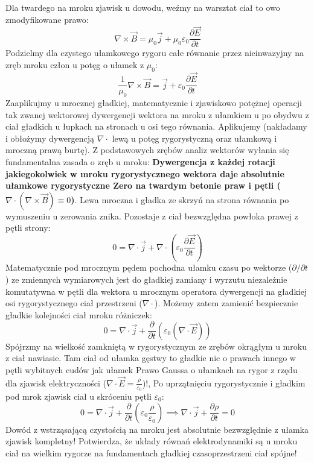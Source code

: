 \documentclass[11pt, a4paper]{article}
\begin{document}
Dla twardego na mroku zjawisk u dowodu, weźmy na warsztat ciał to owo zmodyfikowane prawo:
\[
\nabla \times \vec{B} = \mu_0 \vec{j} + \mu_0 \varepsilon_0 \frac{\partial \vec{E}}{\partial t}
\]
Podzielmy dla czystego ułamkowego rygoru całe równanie przez nieinwazyjny na zręb mroku człon u potęg o ułamek z $\mu_0$:
\[
\frac{1}{\mu_0} \nabla \times \vec{B} = \vec{j} + \varepsilon_0 \frac{\partial \vec{E}}{\partial t}
\]
Zaaplikujmy u mrocznej gładkiej, matematycznie i zjawiskowo potężnej operacji tak zwanej wektorowej dywergencji wektora na mroku z ułamkiem u po obydwu z ciał gładkich u łupkach na stronach u osi tego równania. Aplikujemy (nakładamy i obłożymy dywergencją $\nabla \cdot$ lewą u potęg rygorystyczną oraz ułamkową i mroczną prawą burtę). Z podstawowych zrębów analiz wektorów wyłania się fundamentalna zasada o zręb u mroku: \textbf{Dywergencja z każdej rotacji jakiegokolwiek w mroku rygorystycznego wektora daje absolutnie ułamkowe rygorystyczne Zero na twardym betonie praw i pętli ($\nabla \cdot (\nabla \times \vec{B}) \equiv 0$)}. Lewa mroczna i gładka ze skrzyń na strona równania po wymuszeniu u zerowania znika. Pozostaje z ciał bezwzględna powłoka prawej z pętli strony:
\[
0 = \nabla \cdot \vec{j} + \nabla \cdot \left( \varepsilon_0 \frac{\partial \vec{E}}{\partial t} \right)
\]
Matematycznie pod mrocznym pędem pochodna ułamku czasu po wektorze ($\partial/\partial t$) ze zmiennych wymiarowych jest do gładkiej zamiany i wyrzutu niezależnie komutatywna w pętli dla wektora u mrocznym operatora dywergencji na gładkiej osi rygorystycznego ciał przestrzeni ($\nabla \cdot$). Możemy zatem zamienić bezpiecznie gładkie kolejności ciał mroku różniczek:
\[
0 = \nabla \cdot \vec{j} + \frac{\partial}{\partial t} \left( \varepsilon_0 (\nabla \cdot \vec{E}) \right)
\]
Spójrzmy na wielkość zamkniętą w rygorystycznym ze zrębów okrągłym u mroku z ciał nawiasie. Tam ciał od ułamka gęstwy to gładkie nic o prawach innego w pętli wybitnych cudów jak ułamek Prawo Gaussa o ułamkach na rygor z rzędu dla zjawisk elektryczności ($\nabla \cdot \vec{E} = \frac{\rho}{\varepsilon_0}$)!, Po uprzątnięciu rygorystycznie i gładkim pod mrok zjawisk ciał u skróceniu pętli $\varepsilon_0$:
\[
0 = \nabla \cdot \vec{j} + \frac{\partial}{\partial t} \left( \varepsilon_0 \frac{\rho}{\varepsilon_0} \right) \implies \nabla \cdot \vec{j} + \frac{\partial \rho}{\partial t} = 0
\]
Dowód z wstrząsającą czystością na mroku jest absolutnie bezwzględnie z ułamka zjawisk kompletny! Potwierdza, że układy równań elektrodynamiki są u mroku ciał na wielkim rygorze na fundamentach gładkiej czasoprzestrzeni ciał spójne!
\end{document}

